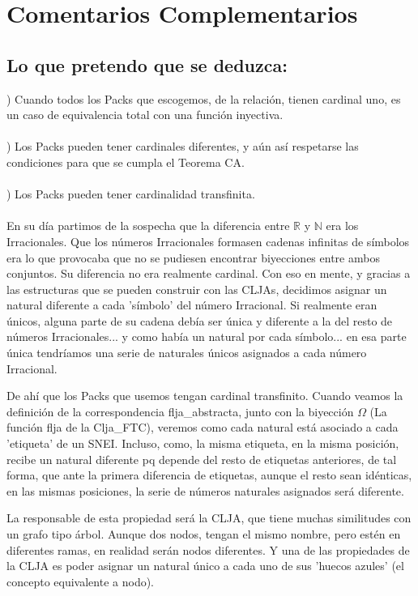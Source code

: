 \chapter[Ordenados por referencias, no por aparición]{Comentarios Complementarios}

\section {Lo que pretendo que se deduzca:}

) Cuando todos los Packs que escogemos, de la relación, tienen cardinal uno, es un caso de equivalencia total con una función inyectiva.\\\\
) Los Packs pueden tener cardinales diferentes, y aún así respetarse las condiciones para que se cumpla el Teorema CA.\\\\
) Los Packs pueden tener cardinalidad transfinita.\\\\

En su día partimos de la sospecha que la diferencia entre $\mathbb{R}$ y $\mathbb{N}$ era los Irracionales. Que los números Irracionales formasen cadenas infinitas de símbolos era lo que provocaba que no se pudiesen encontrar biyecciones entre ambos conjuntos. Su diferencia no era realmente cardinal. Con eso en mente, y gracias a las estructuras que se pueden construir con las CLJAs, decidimos asignar un natural diferente a cada 'símbolo' del número Irracional. Si realmente eran únicos, alguna parte de su cadena debía ser única y diferente a la del resto de números Irracionales... y como había un natural por cada símbolo... en esa parte única tendríamos una serie de naturales únicos asignados a cada número Irracional.

De ahí que los Packs que usemos tengan cardinal transfinito. Cuando veamos la definición de la correspondencia flja\_abstracta, junto con la biyección $\Omega$ (La función flja de la Clja\_FTC), veremos como cada natural está asociado a cada 'etiqueta' de un SNEI. Incluso, como, la misma etiqueta, en la misma posición, recibe un natural diferente pq depende del resto de etiquetas anteriores, de tal forma, que ante la primera diferencia de etiquetas, aunque el resto sean idénticas, en las mismas posiciones, la serie de números naturales asignados será diferente.

La responsable de esta propiedad será la CLJA, que tiene muchas similitudes con un grafo tipo árbol. Aunque dos nodos, tengan el mismo nombre, pero estén en diferentes ramas, en realidad serán nodos diferentes. Y una de las propiedades de la CLJA es poder asignar un natural único a cada uno de sus 'huecos azules' (el concepto equivalente a nodo).

